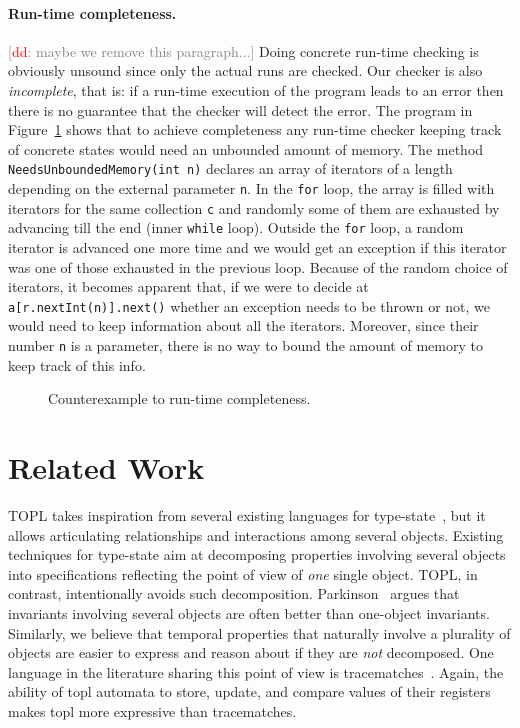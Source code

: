 \documentclass[10pt, preprint]{sigplanconf} %
\newcommand{\noterg}[2]{\textcolor{gray}{[\textcolor{red}{#1}: #2]}}
\newcommand{\dd}[1]{\noterg{dd}{#1}}
\newcommand{\dinocomment}[1]{\dd{#1}}
\begin{document}
\paragraph{Run-time completeness.}
\dinocomment{maybe we remove this paragraph...}
Doing concrete run-time checking is obviously unsound since only the actual runs are checked.
Our checker is also {\em incomplete}, that is:
if a run-time execution of the program leads to an error then there is no guarantee that the checker will detect the error.
The program in Figure~\ref{fig:completeness} shows that to achieve completeness any run-time checker keeping track of concrete states would need an unbounded amount of memory.
The method {\tt NeedsUnboundedMemory(int n)}
declares an array of iterators of a length depending on the external parameter {\tt n}.
 In the {\tt for} loop, the array is filled with iterators for the same collection {\tt c} and randomly some of them are exhausted by advancing till the end (inner {\tt while} loop).
Outside the {\tt for} loop, a random iterator is advanced one more time and we would get an exception if this iterator was one of those exhausted in the previous loop.
Because of the random choice of iterators, it becomes apparent that, if we were to decide at {\tt a[r.nextInt(n)].next()} whether an exception needs to be thrown or not, we would need to keep information about all the iterators.
Moreover, since their number {\tt n} is a parameter, there is no way to bound the amount of memory to keep track of this info.
\begin{figure}[htbp]
\begin{center}

\caption{Counterexample to run-time completeness.}
\label{fig:completeness}
\end{center}
\end{figure}


\section{Related Work}\label{sec:related} %

TOPL takes inspiration from several existing  languages for type-state~\cite{strom1986,dblp:conf/oopsla/bierhoffa07,dblp:conf/oopsla/naeeml08,disney2011,ball2002}, but  it allows articulating  relationships and interactions among several objects.
Existing techniques for type-state aim at decomposing properties involving several objects into specifications reflecting the point of view of {\em one} single object.
TOPL, in contrast,  intentionally avoids such decomposition.
Parkinson~\cite{parkinson-iwaco2007} argues that invariants involving several objects are often better than one-object invariants.
Similarly, we believe that temporal properties that naturally involve a plurality of objects are easier to express and reason about if they are \emph{not} decomposed.
One language in the literature sharing this point of view is tracematches~\cite{dblp:conf/oopsla/allanachklmsst05}.
Again, the ability of topl automata to store,  update, and compare values of their registers makes topl more expressive than tracematches.
\end{document}
